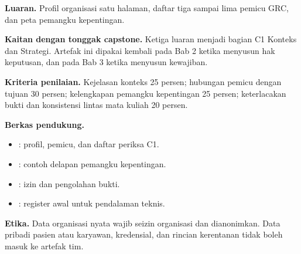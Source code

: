 \textbf{Luaran.} Profil organisasi satu halaman, daftar tiga sampai lima pemicu GRC, dan peta
pemangku kepentingan.

\textbf{Kaitan dengan tonggak capstone.} Ketiga luaran menjadi bagian C1 Konteks dan Strategi.
Artefak ini dipakai kembali pada Bab 2 ketika menyusun hak keputusan, dan pada Bab 3 ketika
menyusun kewajiban.

\textbf{Kriteria penilaian.} Kejelasan konteks 25 persen; hubungan pemicu dengan tujuan 30
persen; kelengkapan pemangku kepentingan 25 persen; keterlacakan bukti dan konsistensi lintas
mata kuliah 20 persen.

\textbf{Berkas pendukung.}
\begin{itemize}
  \item {}: profil, pemicu, dan daftar
  periksa C1.
  \item {}: contoh delapan pemangku
  kepentingan.
  \item {}: izin dan pengolahan bukti.
  \item {}: register awal untuk pendalaman
  teknis.
\end{itemize}

\textbf{Etika.} Data organisasi nyata wajib seizin organisasi dan dianonimkan. Data pribadi
pasien atau karyawan, kredensial, dan rincian kerentanan tidak boleh masuk ke artefak tim.

